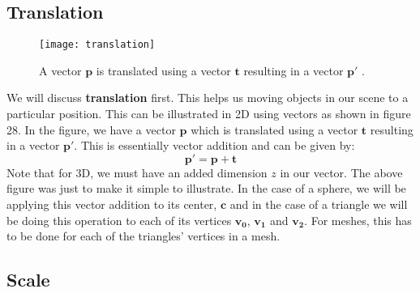 \documentclass[11pt,a4paper]{article}
\begin{document}
	\subsection{Translation}
	\begin{wrapfigure}{r}{4cm}
		\centering
		\texttt{[image: translation]} 
		\caption{A vector $\boldsymbol{p}$ is translated using a vector $\boldsymbol{t}$ resulting in a vector $\boldsymbol{p'}$ \protect\cite{2dtransformations}.}
		\label{fig:scale}
	\end{wrapfigure}
	We will discuss \textbf{translation} first. This helps us moving objects in our scene to a particular position. This can be illustrated in 2D using vectors as shown in figure 28.
	\noindent
	In the figure, we have a vector $\boldsymbol{p}$ which is translated using a vector $\boldsymbol{t}$ resulting in a vector $\boldsymbol{p'}$. This is essentially vector addition and can be given by:
	\begin{equation}
		\boldsymbol{p'} = \boldsymbol{p} + \boldsymbol{t}
	\end{equation}
	Note that for 3D, we must have an added dimension $z$ in our vector. The above figure was just to make it simple to illustrate. In the case of a sphere, we will be applying this vector addition to its center, $\boldsymbol{c}$ and in the case of a triangle we will be doing this operation to each of its vertices $\boldsymbol{v_{0}}$, $\boldsymbol{v_{1}}$ and $\boldsymbol{v_{2}}$. For meshes, this has to be done for each of the triangles' vertices in a mesh. 
	\subsection{Scale}
	
\end{document}
